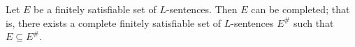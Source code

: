 Let $E$ be a finitely satisfiable set of $L$-sentences. Then $E$ can be completed; that is, there exists a complete finitely satisfiable set of $L$-sentences $E^\#$ such that $E \subseteq E^\#$.
